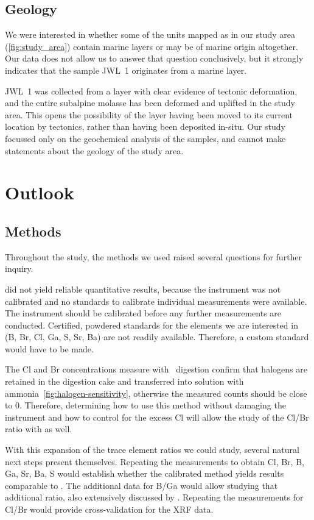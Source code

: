 \subsection{Geology}

We were interested in whether some of the units mapped as \USM in our study area (\cref{fig:study_area})
contain marine layers or may be of marine origin altogether. 
Our data does not allow us to answer that question conclusively, but it strongly indicates that the sample JWL~1
originates from a marine layer.

JWL~1 was collected from a layer with clear evidence of tectonic deformation, and the entire subalpine molasse has been 
deformed and uplifted in the study area. This opens the possibility of the layer having been moved to its current
location by tectonics, rather than having been deposited in-situ. Our study focussed only on the
geochemical analysis of the samples, and cannot make statements about the geology of the study area.


\section{Outlook}

\subsection{Methods}

Throughout the study, the methods we used raised several questions for further inquiry.

\XRF did not yield reliable quantitative results, because the instrument was not calibrated and no standards to
calibrate individual measurements were available.
The instrument should be calibrated before any further measurements are conducted. 
Certified, powdered standards for the elements we are interested in (B, Br, Cl, Ga, S, Sr, Ba) are not readily available.
Therefore, a custom standard would have to be made.

The Cl and Br concentrations measure with \ambif\ digestion confirm that halogens are retained in the digestion cake
and transferred into solution with ammonia~\cref{fig:halogen-sensitivity}, otherwise the
measured counts should be close to 0.
Therefore, determining how to use this method without damaging the instrument and how to control for the excess Cl 
will allow the study of the Cl/Br ratio with \ICPMS as well.

With this expansion of the trace element ratios we could study, several natural next steps present themselves.
Repeating the \XRF measurements to obtain Cl, Br, B, Ga, Sr, Ba, S would establish whether the
calibrated method yields results comparable to \ICPMS. 
The additional data for B/Ga would allow studying that additional ratio, also extensively discussed by \textcite{wei-2020}.
Repeating the \ICPMS measurements for Cl/Br would provide cross-validation for the XRF data.

